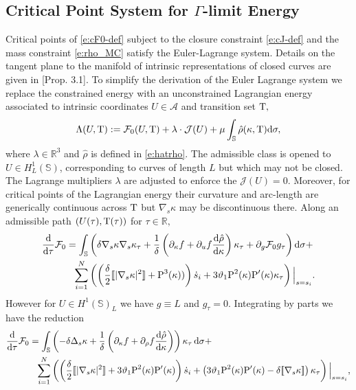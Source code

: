 \documentclass[11pt]{amsart}
\theoremstyle{plain}
\newcommand{\jmp}[1]{[\![#1]\!]}
\def\cA{{\mathcal A}}
\def\cF{{\mathcal F}}
\def\cJ{{\mathcal J}}
\def\mbbR{\mathbb{R}}
\def\mbbS{\mathbb{S}}
\def\mrP{\textrm P}
\def\mrT{\textrm T}
\def\mrd{\textrm d}
\def\cF{{\mathcal F}}
\def\rmd{\mathrm d}
\numberwithin{equation}{section}
\theoremstyle{plain}
\begin{document}
\subsection{Critical Point System for $\Gamma$-limit Energy}
\label{s:EL}
Critical points of \eqref{e:cF0-def} subject to the closure constraint \eqref{e:cJ-def} and the mass constraint \eqref{e:rho_MC} satisfy the Euler-Lagrange system.  Details on the tangent plane to the manifold of intrinsic representations of closed curves are given in \cite{NPW_25}[Prop. 3.1]. To simplify the derivation of the Euler Lagrange system we replace the constrained energy with an unconstrained Lagrangian energy associated to intrinsic coordinates $U\in\cA$ and transition set $\mrT,$
 $$
\begin{aligned}
\Lambda (U,\mrT) := \cF_0(U, \mrT) +\lambda \cdot \cJ(U)+\mu \int_\mbbS \hat\rho(\kappa,\mrT)\mrd\sigma,
\end{aligned}
$$
where $\lambda\in\mbbR^3$ and $\hat\rho$ is defined in \eqref{e:hatrho}. The admissible class is opened to $U\in H^1_L(\mbbS)$, corresponding to curves of length $L$ but which may not be closed. The Lagrange multipliers $\lambda$ are adjusted to enforce the $\cJ(U)=0$.  Moreover, for critical points of the Lagrangian energy their curvature and arc-length are generically continuous across $\mrT$ but $\nabla_s \kappa$  may be discontinuous there.  Along an admissible path $(U(\tau),\mrT(\tau))$ for $\tau\in\mbbR,$ 
$$ \begin{aligned}
    \frac{\rmd}{\mrd\tau} \cF_0 &= \int_\mbbS\left(\delta \nabla_s \kappa\nabla_s \kappa_\tau + \frac{1}{\delta} \left( \partial_\kappa f +\partial_u f \frac{\mrd\hat \rho}{\mrd \kappa}\right)\kappa_\tau + \partial_g\cF_0 g_\tau\right) \rmd \sigma+ \\ 
&\hspace{0.1in}\sum_{i=1}^N \left(\left(\frac{\delta}{2}\jmp{|\nabla_s \kappa|^2} +\mrP^3(\kappa))\right)\dot s_i +
3\vartheta_1\mrP^2(\kappa)\mrP'(\kappa)\kappa_\tau\right)\Bigl|_{s=s_i}.
\end{aligned}$$
However for $U\in H^1(\mbbS)_L$ we have $g\equiv L$ and $g_\tau=0.$ Integrating by parts we have the reduction
$$
\begin{aligned}
 \frac{\mrd}{\mrd\tau} \cF_0
&= \int_\mbbS\left(-\delta\Delta_s \kappa + \frac{1}{\delta} \left( \partial_\kappa f +\partial_\rho f \frac{\mrd\hat \rho}{\mrd \kappa}\right)\right)\kappa_\tau \,\rmd \sigma+\\
&\hspace{0.1in}\sum_{i=1}^N \left(\left(\frac{\delta}{2}\jmp{|\nabla_s \kappa|^2} +3\vartheta_1\mrP^2(\kappa)\mrP'(\kappa)\right)\dot s_i +  \left(3\vartheta_1\mrP^2(\kappa)\mrP'(\kappa)-\delta\jmp{\nabla_s\kappa} \right) \kappa_\tau\right)\Bigl|_{s=s_i},
    \end{aligned}$$
\end{document}
